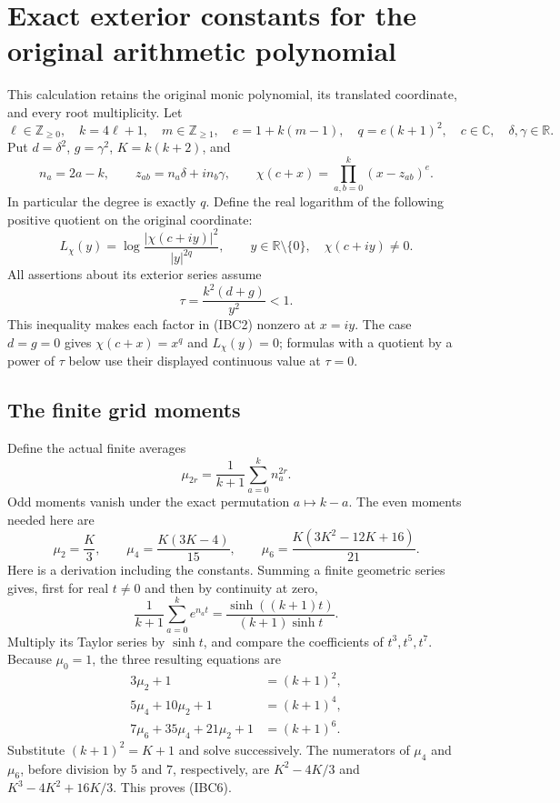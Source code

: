 \section{Exact exterior constants for the original arithmetic polynomial}

This calculation retains the original monic polynomial, its translated
coordinate, and every root multiplicity.  Let
\[
 \ell\in\mathbb Z_{\geq0},\quad k=4\ell+1,\quad
 m\in\mathbb Z_{\geq1},\quad e=1+k(m-1),\quad q=e(k+1)^2,
 \quad c\in\mathbb C,\quad \delta,\gamma\in\mathbb R.
 \tag{IBC1}
\]
Put \(d=\delta^2\), \(g=\gamma^2\), \(K=k(k+2)\), and
\[
 n_a=2a-k,\qquad z_{ab}=n_a\delta+i n_b\gamma,\qquad
 \chi(c+x)=\prod_{a,b=0}^{k}(x-z_{ab})^e.
 \tag{IBC2}
\]
In particular the degree is exactly \(q\).  Define the real logarithm
of the following positive quotient on the original coordinate:
\[
 L_\chi(y)=\log\frac{|\chi(c+iy)|^2}{|y|^{2q}},
 \qquad y\in\mathbb R\setminus\{0\},\quad \chi(c+iy)\ne0.
 \tag{IBC3}
\]
All assertions about its exterior series assume
\[
 \tau=\frac{k^2(d+g)}{y^2}<1.
 \tag{IBC4}
\]
This inequality makes each factor in (IBC2) nonzero at \(x=iy\).
The case \(d=g=0\) gives \(\chi(c+x)=x^q\) and \(L_\chi(y)=0\);
formulas with a quotient by a power of \(\tau\) below use their displayed
continuous value at \(\tau=0\).

\subsection{The finite grid moments}

Define the actual finite averages
\[
 \mu_{2r}=\frac1{k+1}\sum_{a=0}^{k}n_a^{2r}.
 \tag{IBC5}
\]
Odd moments vanish under the exact permutation \(a\mapsto k-a\).
The even moments needed here are
\[
 \mu_2=\frac K3,\qquad
 \mu_4=\frac{K(3K-4)}{15},\qquad
 \mu_6=\frac{K(3K^2-12K+16)}{21}.
 \tag{IBC6}
\]
Here is a derivation including the constants.  Summing a finite geometric
series gives, first for real \(t\ne0\) and then by continuity at zero,
\[
 \frac1{k+1}\sum_{a=0}^{k}e^{n_at}
 =\frac{\sinh((k+1)t)}{(k+1)\sinh t}.
 \tag{IBC7}
\]
Multiply its Taylor series by \(\sinh t\), and compare the coefficients
of \(t^3,t^5,t^7\).  Because \(\mu_0=1\), the three resulting equations are
\[
 \begin{split}
 3\mu_2+1&=(k+1)^2,\\
 5\mu_4+10\mu_2+1&=(k+1)^4,\\
 7\mu_6+35\mu_4+21\mu_2+1&=(k+1)^6.
 \end{split}
 \tag{IBC8}
\]
Substitute \((k+1)^2=K+1\) and solve successively.  The numerators of
\(\mu_4\) and \(\mu_6\), before division by \(5\) and \(7\), respectively,
are \(K^2-4K/3\) and \(K^3-4K^2+16K/3\).  This proves (IBC6).

